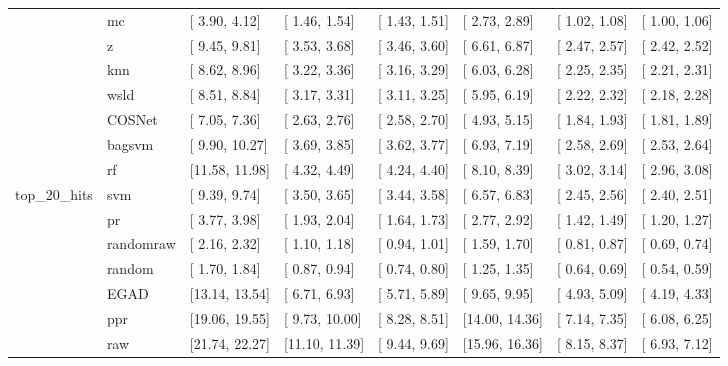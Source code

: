 \begin{table}[H]
{\begin{tabular}{llllllll}
 & mc & [ 3.90,  4.12] & [ 1.46,  1.54] & [ 1.43,  1.51] & [ 2.73,  2.89] & [ 1.02,  1.08] & [ 1.00,  1.06]\\

 & z & [ 9.45,  9.81] & [ 3.53,  3.68] & [ 3.46,  3.60] & [ 6.61,  6.87] & [ 2.47,  2.57] & [ 2.42,  2.52]\\

 & knn & [ 8.62,  8.96] & [ 3.22,  3.36] & [ 3.16,  3.29] & [ 6.03,  6.28] & [ 2.25,  2.35] & [ 2.21,  2.31]\\

 & wsld & [ 8.51,  8.84] & [ 3.17,  3.31] & [ 3.11,  3.25] & [ 5.95,  6.19] & [ 2.22,  2.32] & [ 2.18,  2.28]\\

 & COSNet & [ 7.05,  7.36] & [ 2.63,  2.76] & [ 2.58,  2.70] & [ 4.93,  5.15] & [ 1.84,  1.93] & [ 1.81,  1.89]\\

 & bagsvm & [ 9.90, 10.27] & [ 3.69,  3.85] & [ 3.62,  3.77] & [ 6.93,  7.19] & [ 2.58,  2.69] & [ 2.53,  2.64]\\

 & rf & [11.58, 11.98] & [ 4.32,  4.49] & [ 4.24,  4.40] & [ 8.10,  8.39] & [ 3.02,  3.14] & [ 2.96,  3.08]\\

\multirow{-15}{*}{\raggedright\arraybackslash top\_20\_hits} & svm & [ 9.39,  9.74] & [ 3.50,  3.65] & [ 3.44,  3.58] & [ 6.57,  6.83] & [ 2.45,  2.56] & [ 2.40,  2.51]\\
\cmidrule{1-8}
 & pr & [ 3.77,  3.98] & [ 1.93,  2.04] & [ 1.64,  1.73] & [ 2.77,  2.92] & [ 1.42,  1.49] & [ 1.20,  1.27]\\

 & randomraw & [ 2.16,  2.32] & [ 1.10,  1.18] & [ 0.94,  1.01] & [ 1.59,  1.70] & [ 0.81,  0.87] & [ 0.69,  0.74]\\

 & random & [ 1.70,  1.84] & [ 0.87,  0.94] & [ 0.74,  0.80] & [ 1.25,  1.35] & [ 0.64,  0.69] & [ 0.54,  0.59]\\

 & EGAD & [13.14, 13.54] & [ 6.71,  6.93] & [ 5.71,  5.89] & [ 9.65,  9.95] & [ 4.93,  5.09] & [ 4.19,  4.33]\\

 & ppr & [19.06, 19.55] & [ 9.73, 10.00] & [ 8.28,  8.51] & [14.00, 14.36] & [ 7.14,  7.35] & [ 6.08,  6.25]\\

 & raw & [21.74, 22.27] & [11.10, 11.39] & [ 9.44,  9.69] & [15.96, 16.36] & [ 8.15,  8.37] & [ 6.93,  7.12]\\


\end{tabular}}
\end{table}
